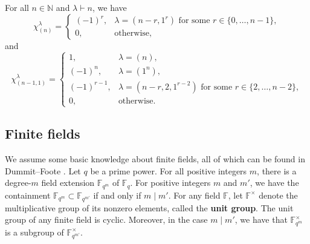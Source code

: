 \documentclass[Unicode,ALCO]{cedram}
\newcommand{\F}{\mathbb{F}}
\newcommand{\N}{\mathbb{N}}
\newcommand{\myemph}{\textbf}
\begin{document}
\begin{samepage}
\begin{corollary} \label{MNrule_ncycle}
For all \(n \in \N\) and \(\lambda \vdash n\), we have
\begin{equation}
\chi^\lambda_{(n)} =
\begin{cases}
(-1)^r, & \lambda = (n-r,1^r) \text{ for some } r \in \{0,\ldots,n-1\}, \\
0, & \text{otherwise},
\end{cases}
\end{equation}
and
\begin{equation}
\chi^\lambda_{(n-1,1)} = \begin{cases}
1,          & \lambda = (n), \\
(-1)^n,     & \lambda = (1^n), \\
(-1)^{r-1}, & \lambda = (n-r, 2, 1^{r-2}) \text{ for some } r \in \{2,\ldots,n-2\}, \\
0,          & \text{otherwise}.
\end{cases}
\end{equation}
\end{corollary}
\end{samepage}























\subsection{Finite fields}

We assume some basic knowledge about finite fields, all of which can be found in Dummit--Foote \cite{DF}.
Let \(q\) be a prime power.
For all positive integers \(m\), there is a degree-\(m\) field extension \(\F_{q^m}\) of \(\F_q\).
For positive integers \(m\) and \(m'\), we have the containment \(\F_{q^m} \subset \F_{q^{m'}}\) if and only if \(m \mid m'\).
For any field \(\F\), let \(\F^\times\) denote the multiplicative group of its nonzero elements, called the \myemph{unit group}.
The unit group of any finite field is cyclic.
Moreover, in the case \(m \mid m'\), we have that \(\F_{q^m}^\times\) is a subgroup of \(\F_{q^{m'}}^\times\).
\end{document}
